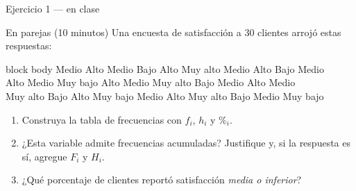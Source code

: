 \documentclass[aspectratio=169,10pt]{beamer}
\begin{document}
\begin{frame}{Ejercicio 1 — en clase}
  \begin{alertblock}{En parejas (10 minutos)}
    \footnotesize
    Una encuesta de satisfacción a 30 clientes arrojó estas respuestas:

    \vspace{0.2cm}
    \begin{beamercolorbox}[wd=0.95\textwidth,sep=0.12cm]{block body}
      \centering\scriptsize\ttfamily
      Medio Alto Medio Bajo Alto Muy alto Medio Alto Bajo Medio \\
      Alto Medio Muy bajo Alto Medio Muy alto Bajo Medio Alto Medio \\
      Muy alto Bajo Alto Muy bajo Medio Alto Muy alto Bajo Medio Muy bajo
    \end{beamercolorbox}

    \vspace{0.25cm}
    \begin{enumerate}
      \item Construya la tabla de frecuencias con $f_i$, $h_i$ y $\%_i$.
      \item ¿Esta variable admite frecuencias acumuladas? Justifique y, si la
            respuesta es sí, agregue $F_i$ y $H_i$.
      \item ¿Qué porcentaje de clientes reportó satisfacción \emph{media o
            inferior}?
    \end{enumerate}
  \end{alertblock}
\end{frame}
\end{document}
